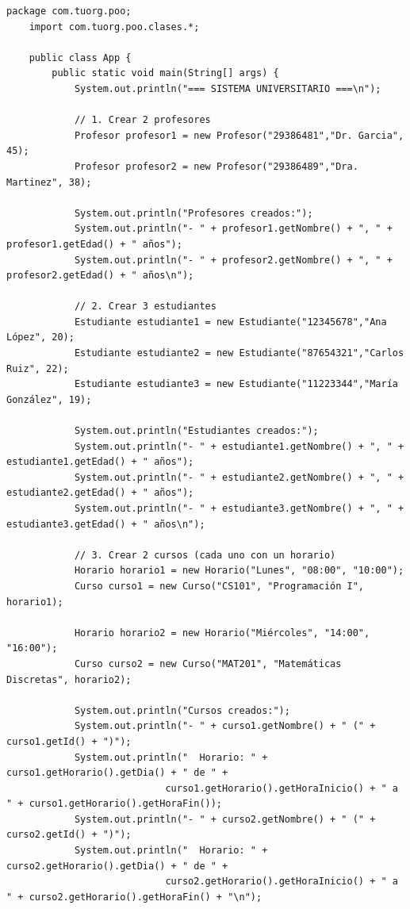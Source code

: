 \begin{lstlisting}[style=java-custom, caption={Función Main en Java}]
    package com.tuorg.poo;
    import com.tuorg.poo.clases.*;

    public class App {
        public static void main(String[] args) {
            System.out.println("=== SISTEMA UNIVERSITARIO ===\n");
            
            // 1. Crear 2 profesores
            Profesor profesor1 = new Profesor("29386481","Dr. Garcia", 45);
            Profesor profesor2 = new Profesor("29386489","Dra. Martinez", 38);

            System.out.println("Profesores creados:");
            System.out.println("- " + profesor1.getNombre() + ", " + profesor1.getEdad() + " años");
            System.out.println("- " + profesor2.getNombre() + ", " + profesor2.getEdad() + " años\n");
            
            // 2. Crear 3 estudiantes
            Estudiante estudiante1 = new Estudiante("12345678","Ana López", 20);
            Estudiante estudiante2 = new Estudiante("87654321","Carlos Ruiz", 22);
            Estudiante estudiante3 = new Estudiante("11223344","María González", 19);

            System.out.println("Estudiantes creados:");
            System.out.println("- " + estudiante1.getNombre() + ", " + estudiante1.getEdad() + " años");
            System.out.println("- " + estudiante2.getNombre() + ", " + estudiante2.getEdad() + " años");
            System.out.println("- " + estudiante3.getNombre() + ", " + estudiante3.getEdad() + " años\n");
            
            // 3. Crear 2 cursos (cada uno con un horario)
            Horario horario1 = new Horario("Lunes", "08:00", "10:00");
            Curso curso1 = new Curso("CS101", "Programación I", horario1);
            
            Horario horario2 = new Horario("Miércoles", "14:00", "16:00");
            Curso curso2 = new Curso("MAT201", "Matemáticas Discretas", horario2);
            
            System.out.println("Cursos creados:");
            System.out.println("- " + curso1.getNombre() + " (" + curso1.getId() + ")");
            System.out.println("  Horario: " + curso1.getHorario().getDia() + " de " + 
                            curso1.getHorario().getHoraInicio() + " a " + curso1.getHorario().getHoraFin());
            System.out.println("- " + curso2.getNombre() + " (" + curso2.getId() + ")");
            System.out.println("  Horario: " + curso2.getHorario().getDia() + " de " + 
                            curso2.getHorario().getHoraInicio() + " a " + curso2.getHorario().getHoraFin() + "\n");
            

\end{lstlisting}
